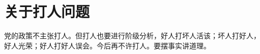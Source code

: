 \section[关于打人问题（一九六六年八月一日）]{关于打人问题}


党的政策不主张打人。但打人也要进行阶级分析，好人打坏人活该；坏人打好人，好人光荣；好人打好人误会。今后再不许打人。要摆事实讲道理。

